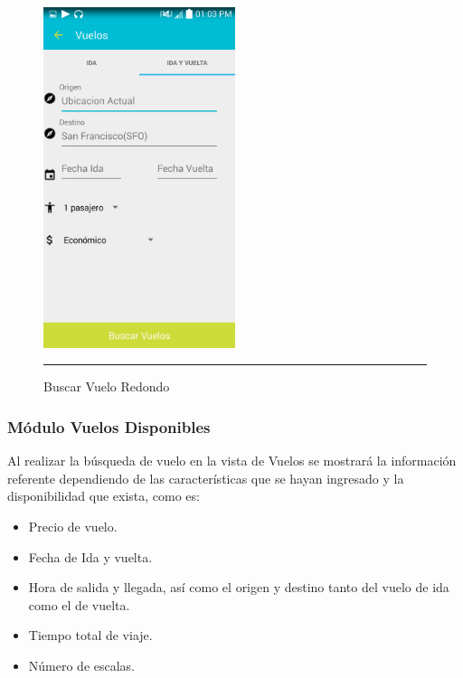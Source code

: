 \begin{figure}[h]
	\centering
		\includegraphics[width=0.5\textwidth]{Figuras/idavueltavuelos.png}
		\rule{30em}{0.5pt}
	\caption[Buscar Vuelo Redondo]{Buscar Vuelo Redondo}
	\label{fig:vueloRedondo}
\end{figure}
\clearpage

\subsubsection{Módulo Vuelos Disponibles}
Al realizar la búsqueda de vuelo en la vista de Vuelos se mostrará la información referente dependiendo de las características que se hayan ingresado y la disponibilidad que exista, 
como es:
\begin{itemize}
\item Precio de vuelo.
\item Fecha de Ida y vuelta.
\item Hora de salida y llegada, así como el origen y destino tanto del vuelo de ida como el de vuelta.
\item Tiempo total de viaje.
\item Número de escalas.
\end{itemize}

